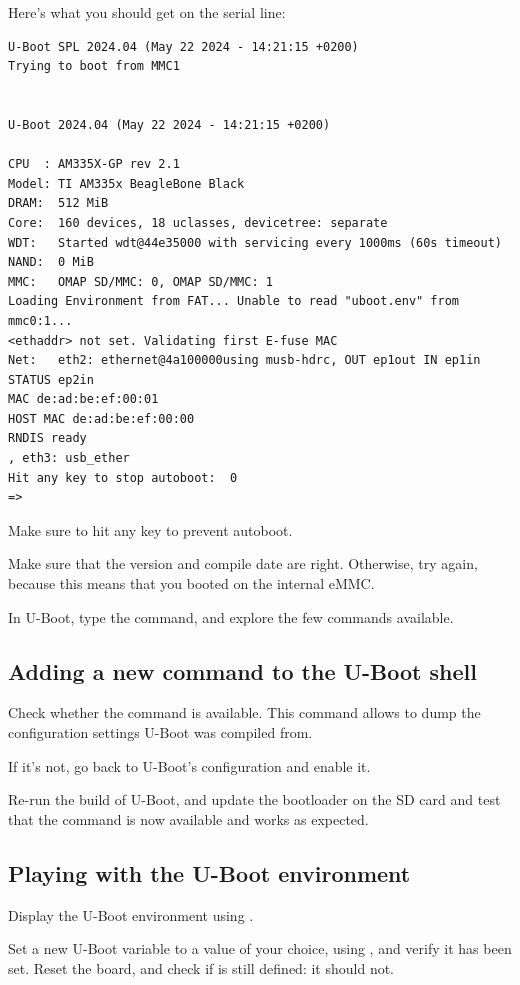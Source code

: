 Here's what you should get on the serial line:

\begin{verbatim}
U-Boot SPL 2024.04 (May 22 2024 - 14:21:15 +0200)
Trying to boot from MMC1


U-Boot 2024.04 (May 22 2024 - 14:21:15 +0200)

CPU  : AM335X-GP rev 2.1
Model: TI AM335x BeagleBone Black
DRAM:  512 MiB
Core:  160 devices, 18 uclasses, devicetree: separate
WDT:   Started wdt@44e35000 with servicing every 1000ms (60s timeout)
NAND:  0 MiB
MMC:   OMAP SD/MMC: 0, OMAP SD/MMC: 1
Loading Environment from FAT... Unable to read "uboot.env" from mmc0:1...
<ethaddr> not set. Validating first E-fuse MAC
Net:   eth2: ethernet@4a100000using musb-hdrc, OUT ep1out IN ep1in STATUS ep2in
MAC de:ad:be:ef:00:01
HOST MAC de:ad:be:ef:00:00
RNDIS ready
, eth3: usb_ether
Hit any key to stop autoboot:  0
=>
\end{verbatim}

Make sure to hit any key to prevent autoboot.

Make sure that the version and compile date are right. Otherwise, try
again, because this means that you booted on the internal eMMC.

In U-Boot, type the  command, and explore the few commands
available.

\subsection{Adding a new command to the U-Boot shell}

Check whether the  command is available. This command
allows to dump the configuration settings U-Boot was compiled from.

If it's not, go back to U-Boot's configuration and enable it.

Re-run the build of U-Boot, and update the bootloader on the SD card
and test that the command is now available and works as expected.

\subsection{Playing with the U-Boot environment}

Display the U-Boot environment using .

Set a new U-Boot variable  to a value of your choice, using
, and verify it has been set. Reset the board, and check
if  is still defined: it should not.

